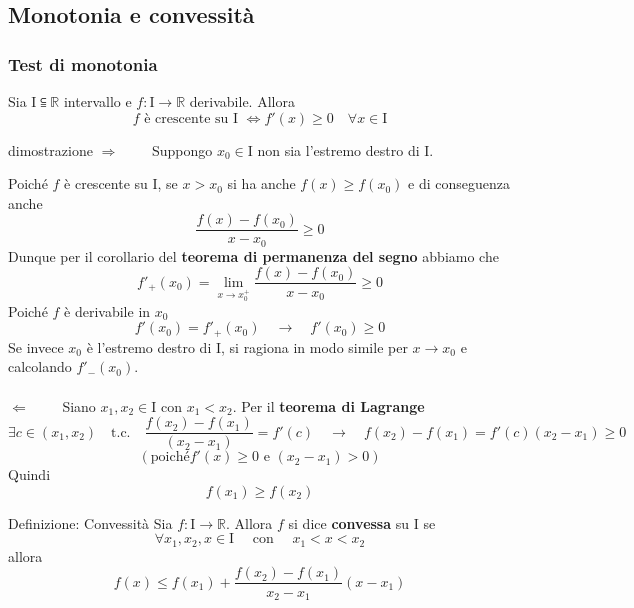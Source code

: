 \documentclass[x11names]{article}
\begin{document}
	\subsection{Monotonia e convessità}
	\begin{center}
		\colorbox{myred}{\begin{minipage}{5.75in}
				\begin{redes}{}
					\subsubsection{Test di monotonia}
					Sia $\text{I} \subseteqq \mathbb{R}$ intervallo e $f: \text{I} \to \mathbb{R}$ derivabile. Allora 
					\[
					f \text{ è crescente su I } \Longleftrightarrow f'(x) \geq 0 \quad \forall x \in \text{I}
					\]
				\end{redes}
		\end{minipage}}        
	\end{center}
	\begin{es}{dimostrazione}
	$\Longrightarrow \qquad$ Suppongo $x_0 \in \text{I}$ non sia l'estremo destro di I.
	
	Poiché $f$ è crescente su I, se $x > x_0$ si ha anche $f(x) \geq f(x_0)$ e di conseguenza anche
	\[
	\frac{f(x) -f(x_0)}{x-x_0} \geq 0
	\]
	Dunque per il corollario del \textbf{teorema di permanenza del segno} abbiamo che
	\[
	f'_+(x_0) = \lim_{x \to x_0^+} \frac{f(x) -f(x_0)}{x-x_0} \geq 0
	\]
	Poiché $f$ è derivabile in $x_0$ 
	\[
	f'(x_0) = f'_+(x_0) \quad \to \quad f'(x_0) \geq 0
	\]
	Se invece $x_0$ è l'estremo destro di I, si ragiona in modo simile per $x \to x_0$ e calcolando $f'_-(x_0)$. \\ \\
	
	$\Longleftarrow \qquad$ Siano $x_1, x_2 \in \text{I}$ con $x_1 < x_2$. Per il \textbf{teorema di Lagrange}
	\[
	\exists c \in (x_1, x_2) \quad \text{t.c.} \quad  \frac{f(x_2) - f(x_1)}{(x_2-x_1)} = f'(c) \quad \to \quad f(x_2) - f(x_1) = f'(c)(x_2-x_1) \geq 0 
	\]
	\[
	(\text{poiché} f'(x) \geq 0 \text{ e } (x_2 - x_1) > 0)
	\]
	Quindi
	\[
	f(x_1) \geq f(x_2)
	\]
	\end{es}
	
		\begin{center}
		\colorbox{myblue}{\begin{minipage}{5.75in}
				\begin{blues}{Definizione: Convessità}
					Sia $f: \text{I} \to \mathbb{R}$. Allora $f$ si dice \textbf{convessa} su $\text{I}$ se 
					\[
					\forall x_1, x_2, x \in \text{I} \quad \text{ con } \quad x_1 < x < x_2
					\]
					allora
					\[
					f(x) \leq f(x_1) + \frac{f(x_2) - f(x_1)}{x_2 - x_1}(x-x_1)
					\]
				\end{blues}
		\end{minipage}}       
	\end{center}
	
\end{document}
